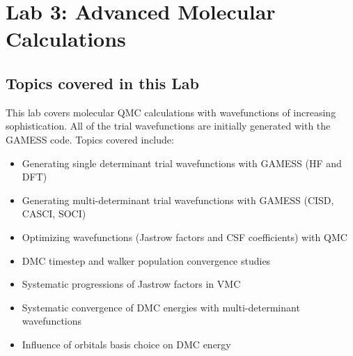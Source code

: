 \chapter{Lab 3: Advanced Molecular Calculations}
\label{chap:lab_advanced_molecules}

\section{Topics covered in this Lab}
This lab covers molecular QMC calculations with wavefunctions of increasing sophistication.  All of the trial wavefunctions are initially generated with the GAMESS code.  Topics covered include:
\begin{itemize}
  \item{Generating single determinant trial wavefunctions with GAMESS (HF and DFT)}
  \item{Generating multi-determinant trial wavefunctions with GAMESS (CISD, CASCI, SOCI)}
  \item{Optimizing wavefunctions (Jastrow factors and CSF coefficients) with QMC}
  \item{DMC timestep and walker population convergence studies}
  \item{Systematic progressions of Jastrow factors in VMC}
  \item{Systematic convergence of DMC energies with multi-determinant wavefunctions}
  \item{Influence of orbitals basis choice on DMC energy}
\end{itemize}

